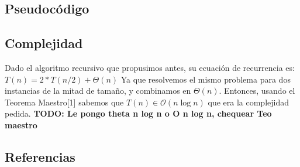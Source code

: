 \subsection{Pseudocódigo}

\begin{algorithmic}


    \State {}
  \EndIf

    \State {}
  \EndIf

\EndFunction

\end{algorithmic}


\subsection{Complejidad}
Dado el algoritmo recursivo que propusimos antes, su ecuación de recurrencia es:
\newline
$T(n) = 2 * T(n/2 ) + \Theta(n)$
\newline
Ya que resolvemos el mismo problema para dos instancias de la mitad de tamaño, y combinamos
en $\Theta(n)$. Entonces, usando el Teorema Maestro[1] sabemos que
$T(n) \in \mathcal{O}(n\log{}n)$ que era la complejidad pedida.
\textbf{TODO: Le pongo theta n log n o O n log n, chequear Teo maestro}


\subsection{Referencias}
